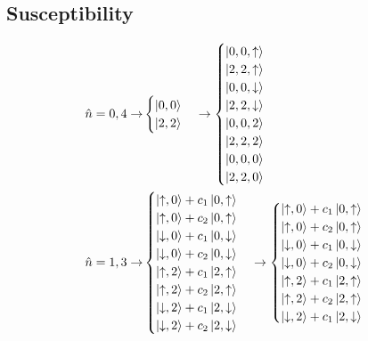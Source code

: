 \documentclass[12pt,twoside]{article}
\numberwithin{equation}{section}
\begin{document}
\subsection{Susceptibility}
\begin{equation}\begin{aligned}
\hat n=0,4\rightarrow &\begin{cases}
	\ket{0,0}\\
	\ket{2,2}\\
\end{cases}\rightarrow \begin{cases}
	\ket{0,0, \uparrow}\\
	\ket{2,2, \uparrow}\\
	\ket{0,0, \downarrow}\\
	\ket{2,2, \downarrow}\\
	\ket{0,0, 2}\\
	\ket{2,2, 2}\\
	\ket{0,0, 0}\\
	\ket{2,2, 0}\\
\end{cases}\\
\hat n=1,3 \rightarrow &\begin{cases}
	\ket{\uparrow,0} + c_1\ket{0, \uparrow}\\
	\ket{\uparrow,0} + c_2\ket{0, \uparrow}\\
	\ket{\downarrow,0} + c_1\ket{0, \downarrow}\\
	\ket{\downarrow,0} + c_2\ket{0, \downarrow}\\
	\ket{\uparrow,2} + c_1\ket{2, \uparrow}\\
	\ket{\uparrow,2} + c_2\ket{2, \uparrow}\\
	\ket{\downarrow,2} + c_1\ket{2, \downarrow}\\
	\ket{\downarrow,2} + c_2\ket{2, \downarrow}\\
\end{cases}\rightarrow \begin{cases}
	\ket{\uparrow,0} + c_1\ket{0, \uparrow}\\
	\ket{\uparrow,0} + c_2\ket{0, \uparrow}\\
	\ket{\downarrow,0} + c_1\ket{0, \downarrow}\\
	\ket{\downarrow,0} + c_2\ket{0, \downarrow}\\
	\ket{\uparrow,2} + c_1\ket{2, \uparrow}\\
	\ket{\uparrow,2} + c_2\ket{2, \uparrow}\\
	\ket{\downarrow,2} + c_1\ket{2, \downarrow}\\

\end{cases}
\end{aligned}
\end{equation}
\end{document}

